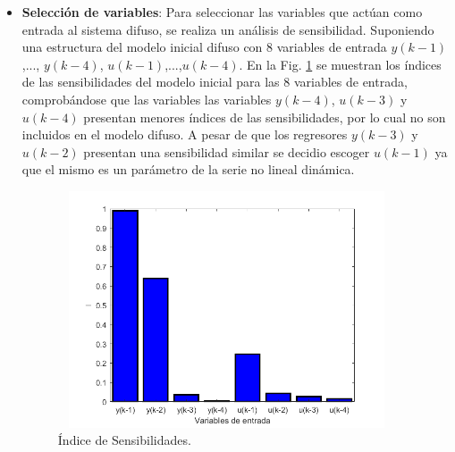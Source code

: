 \documentclass[12pt]{article}
\begin{document}
\begin{itemize}
	\item \textbf{Selección de variables}:
Para seleccionar las variables que actúan como entrada al sistema difuso, se realiza un análisis de sensibilidad. Suponiendo una estructura del modelo inicial difuso con 8 variables de entrada $y(k-1)$,..., $y(k-4)$, $u(k-1)$,...,$u(k-4)$. En la Fig. \ref{f_P1Sensibilidad} se muestran los índices de las sensibilidades del modelo inicial para las 8
variables de entrada, comprobándose que las variables las variables $y(k-4)$, $u(k-3)$ y $u(k-4)$ presentan menores índices de las sensibilidades, por lo cual no son incluidos en el modelo difuso. A pesar de que los regresores $y(k-3)$ y $u(k-2)$ presentan una sensibilidad similar se decidio escoger $u(k-1)$ ya que el mismo es un parámetro de la serie no lineal dinámica.

\begin{figure}[h!]
\centering
\includegraphics[width=10cm,height=7cm]{imag/P1Sensibilidad}
\caption{Índice de Sensibilidades.}
\label{f_P1Sensibilidad}
\end{figure}


\end{itemize}
\end{document}
